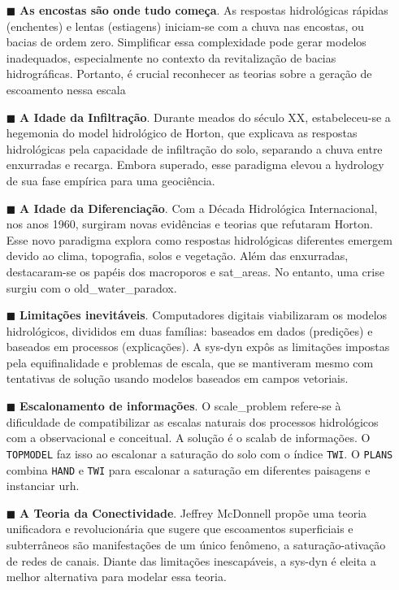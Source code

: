 \documentclass[./main.tex]{subfiles}
\begin{document}
\begin{itemize}
    \item[$\blacksquare$] \textbf{As encostas são onde tudo começa}. As respostas hidrológicas rápidas (enchentes) e lentas (estiagens) iniciam-se com a chuva nas encostas, ou bacias de ordem zero. Simplificar essa complexidade pode gerar modelos inadequados, especialmente no contexto da revitalização de bacias hidrográficas. Portanto, é crucial reconhecer as teorias sobre a geração de escoamento nessa escala
    
    \item[$\blacksquare$] \textbf{A Idade da Infiltração}. Durante meados do século XX, estabeleceu-se a hegemonia do \gls{model} hidrológico de Horton, que explicava as respostas hidrológicas pela capacidade de infiltração do solo, separando a chuva entre enxurradas e recarga. Embora superado, esse \gls{paradigma} elevou a \gls{hydrology} de sua fase empírica para uma geociência.

    \item[$\blacksquare$] \textbf{A Idade da Diferenciação}. Com a Década Hidrológica Internacional, nos anos 1960, surgiram novas evidências e teorias que refutaram Horton. Esse novo \gls{paradigma} explora como respostas hidrológicas diferentes emergem devido ao clima, topografia, solos e vegetação. Além das enxurradas, destacaram-se os papéis dos macroporos e \gls{sat_areas}. No entanto, uma crise surgiu com o \gls{old_water_paradox}.
    
    \item[$\blacksquare$] \textbf{Limitações inevitáveis}. Computadores digitais viabilizaram os modelos hidrológicos, divididos em duas famílias: baseados em dados (predições) e baseados em processos (explicações). A \gls{sys-dyn} expôs as limitações impostas pela equifinalidade e problemas de escala, que se mantiveram mesmo com tentativas de solução usando modelos baseados em campos vetoriais.
    
    \item[$\blacksquare$] \textbf{Escalonamento de informações}. O \gls{scale_problem} refere-se à dificuldade de compatibilizar as escalas naturais dos processos hidrológicos com a observacional e conceitual. A solução é o \gls{scalab} de informações. O \texttt{TOPMODEL} faz isso ao escalonar a saturação do solo com o índice \texttt{TWI}. O \texttt{PLANS} combina \texttt{HAND} e \texttt{TWI} para escalonar a saturação em diferentes paisagens e instanciar \gls{urh}.
    
    \item[$\blacksquare$] \textbf{A Teoria da Conectividade}. Jeffrey McDonnell propõe uma \gls{teoria} unificadora e revolucionária que sugere que escoamentos superficiais e subterrâneos são manifestações de um único fenômeno, a saturação-ativação de redes de canais. Diante das limitações inescapáveis, a \gls{sys-dyn} é eleita a melhor alternativa para modelar essa \gls{teoria}.
    
\end{itemize}
\end{document}
